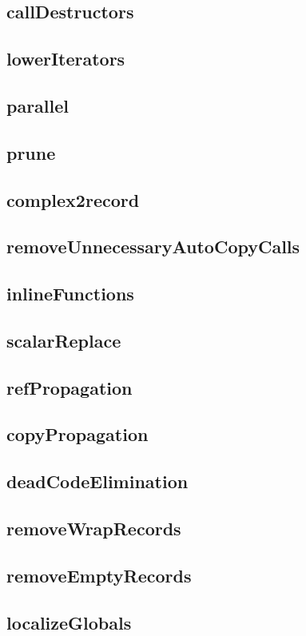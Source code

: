 \documentclass[10pt]{article}
\begin{document}
\subsection{callDestructors}
\subsection{lowerIterators}
\label{sec:lowerIterators}
\subsection{parallel}
\subsection{prune}
\subsection{complex2record}
\subsection{removeUnnecessaryAutoCopyCalls}
\subsection{inlineFunctions}
\subsection{scalarReplace}
\subsection{refPropagation}
\subsection{copyPropagation}
\subsection{deadCodeElimination}
\subsection{removeWrapRecords}
\subsection{removeEmptyRecords}
\subsection{localizeGlobals}
\end{document}
